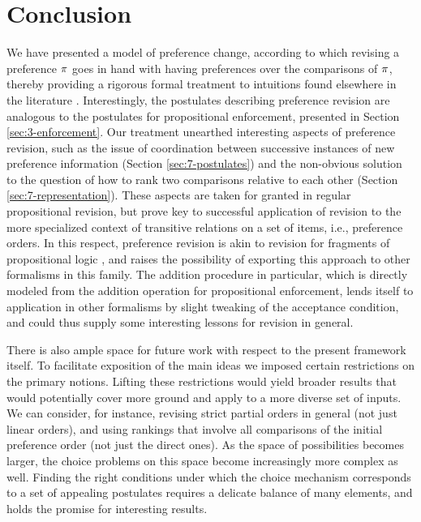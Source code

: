\section{Conclusion}\label{sec:7-conclusion}
We have presented a model of preference change,
according to which revising a preference $\pi$ 
goes in hand with having preferences over the comparisons of $\pi$,
thereby providing a rigorous formal treatment to intuitions found elsewhere 
in the literature
\cite{Sen77,Grune-YanoffH09b}.
Interestingly, the postulates describing preference revision 
are analogous to the postulates for propositional enforcement,
presented in Section \ref{sec:3-enforcement}.
Our treatment unearthed interesting aspects of preference revision,
such as the issue of coordination between successive instances 
of new preference information (Section \ref{sec:7-postulates})
and the non-obvious solution to the question of how to rank two comparisons relative
to each other (Section \ref{sec:7-representation}).
These aspects are taken for granted in regular propositional revision, but prove key
to successful application of revision to the more specialized context of transitive relations
on a set of items, i.e., preference orders.
In this respect, preference revision is akin to revision for fragments of propositional logic
\cite{DelgrandePW18}, and raises the possibility of exporting this approach
to other formalisms in this family. The addition procedure in particular,
which is directly modeled from the addition operation for propositional enforcement,
lends itself to application in other formalisms by slight tweaking of the acceptance condition,
and could thus supply some interesting lessons for revision in general.

There is also ample space for future work with respect to the present framework itself.
To facilitate exposition of the main ideas we imposed certain restrictions on the primary notions.
Lifting these restrictions would yield broader results that would potentially cover more ground and apply
to a more diverse set of inputs. We can consider, for instance, revising strict partial orders in general
(not just linear orders), and using rankings that involve all comparisons of the initial preference order
(not just the direct ones).
As the space of possibilities becomes larger, the choice problems on this space become increasingly more complex
as well. Finding the right conditions under which the choice mechanism corresponds to a set of appealing postulates
requires a delicate balance of many elements, and holds the promise for interesting results.
